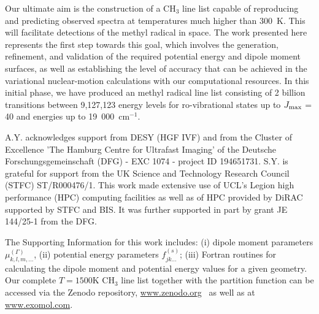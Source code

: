 \documentclass{achemso}
\newcommand{\3}{$_{3}$}
\begin{document}
Our ultimate aim is the construction of a CH$_{3}$ line list capable
of reproducing and predicting observed spectra at temperatures much higher than  300~K.
This will facilitate
 detections of the methyl radical in space.
The work presented here represents the first step towards this goal, which
involves the generation, refinement, and validation of the required
potential energy and dipole moment surfaces, as well as establishing
the level of accuracy that can be achieved in the variational nuclear-motion
calculations with our computational resources.
In this initial phase, we have produced an methyl radical line list consisting
of 2 billion transitions between 9,127,123 energy levels for ro-vibrational
states up to $J_{\rm max}$ = 40 and energies up to 19~000~cm$^{-1}$.

\clearpage

\begin{acknowledgement}
A.Y. acknowledges support from DESY (HGF IVF) and from the Cluster of Excellence 'The Hamburg Centre for Ultrafast Imaging' of the Deutsche Forschungsgemeinschaft (DFG) - EXC 1074 - project ID 194651731.
S.Y. is grateful for support from the UK Science and Technology Research Council (STFC)
ST/R000476/1. This work made extensive use of UCL's Legion high performance (HPC) computing facilities as well as of HPC provided by DiRAC supported by STFC and BIS.
It was further supported in part by  grant JE 144/25-1 from the DFG.
\end{acknowledgement}

\begin{suppinfo}
The Supporting Information for this work includes: (i) dipole moment parameters $\mu_{k,l,m,\ldots}^{(\Gamma)}$,  (ii) potential energy parameters
$f_{jk\dots}^{(s)}$; (iii) Fortran routines for calculating the dipole moment and potential energy values for a given geometry.  Our complete $T=1500$K CH$_3$ line list together with the partition function can be accessed via the Zenodo repository, \url{www.zenodo.org}~\cite{19AdYaYu.zenodo} as well as at \url{www.exomol.com}.


\end{suppinfo}

\clearpage
\end{document}
